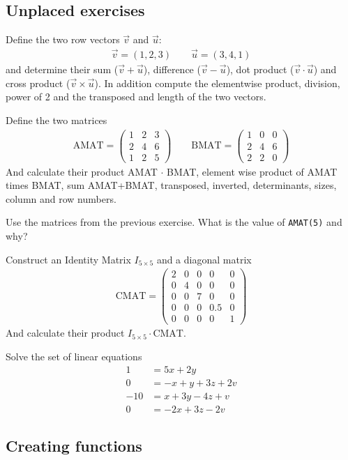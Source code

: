 \subsection{Unplaced exercises}

\begin{ex}
Define the two row vectors $\vec{v}$ and $\vec{u}$:
\begin{align*}
\vec{v} = (1, 2, 3) \qquad \vec{u} = (3, 4, 1)
\end{align*}
and determine their 
sum ($\vec{v} + \vec{u}$),
difference ($\vec{v} - \vec{u}$),
dot product ($\vec{v} \cdot \vec{u}$) and
cross product ($\vec{v} \times \vec{u}$).
In addition compute the elementwise product, division, power of 2 and 
the transposed and length of the two vectors.
\end{ex}


\begin{ex}
Define the two matrices
\begin{align*}
\textrm{AMAT} = \begin{pmatrix}
1 &2 &3	\\
2 &4 &6	\\
1 &2 &5
\end{pmatrix}
\qquad
\textrm{BMAT} =
\begin{pmatrix}
1 &0 &0	\\
2 &4 &6	\\
2 &2 &0
\end{pmatrix}
\end{align*}
And calculate their product AMAT $\cdot$ BMAT, element wise product of AMAT times BMAT, sum
AMAT+BMAT, transposed, inverted, determinants, sizes, column and row numbers.
\end{ex}


\begin{ex}
Use the matrices from the previous exercise. What is the value of \verb!AMAT(5)! and why?
\end{ex}


\begin{ex}
Construct an Identity Matrix $I_{5\times5}$ and a diagonal matrix
\begin{align*}
\textrm{CMAT} = \begin{pmatrix}
2 &0 &0 &0 &0	\\
0 &4 &0 &0 &0	\\
0 &0 &7 &0 &0	\\
0 &0 &0 &0.5 &0	\\
0 &0 &0 &0 &1	
\end{pmatrix}
\end{align*}
And calculate their product $I_{5 \times 5} \cdot \textrm{CMAT}$.
\end{ex}


\begin{ex}
Solve the set of linear equations
\begin{align*}
1	& = 5x + 2y	\\
0	& = -x + y + 3z + 2v	\\
-10 	& = x + 3y - 4z + v	\\
0	& = -2x + 3z - 2v 
\end{align*}
\end{ex}
\known{$\backslash$}




\subsection{Creating functions}


